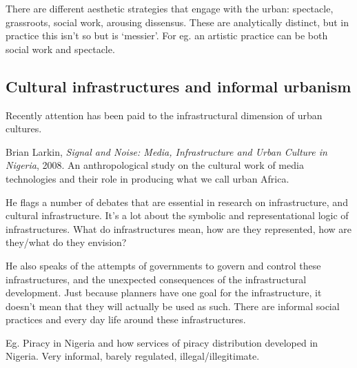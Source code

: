 \documentclass{article}
\begin{document}
There are different aesthetic strategies that engage with the urban: spectacle, grassroots, social work, arousing dissensus. These are analytically distinct, but in practice this isn't so but is `messier'. For eg. an artistic practice can be both social work and spectacle.

\subsection{Cultural infrastructures and informal urbanism}

Recently attention has been paid to the infrastructural dimension of urban cultures.

Brian Larkin, \textit{Signal and Noise: Media, Infrastructure and Urban Culture in Nigeria}, 2008. An anthropological study on the cultural work of media technologies and their role in producing what we call urban Africa.

He flags a number of debates that are essential in research on infrastructure, and cultural infrastructure. It's a lot about the symbolic and representational logic of infrastructures. What do infrastructures mean, how are they represented, how are they/what do they envision?

He also speaks of the attempts of governments to govern and control these infrastructures, and the unexpected consequences of the infrastructural development. Just because planners have one goal for the infrastructure, it doesn't mean that they will actually be used as such. There are informal social practices and every day life around these infrastructures.

Eg. Piracy in Nigeria and how services of piracy distribution developed in Nigeria. Very informal, barely regulated, illegal/illegitimate. 

\begin{outline}
	\1
\end{outline}

\subsection{}

\begin{outline}
	\1
\end{outline}

\subsection{}
\end{document}
